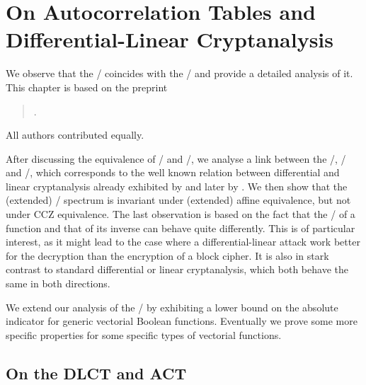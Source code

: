 \chapter[On Autcorrelation Tables]{On Autocorrelation Tables and Differential-Linear Cryptanalysis}\label{ch:act}

\vspace*{-\baselineskip}
\hspace{1.5em}
We observe that the \DLCT/ coincides with the \ACT/ and provide a detailed analysis of it.
This chapter is based on the preprint
\begin{quote}
    .
\end{quote}
All authors contributed equally.

After discussing the equivalence of \DLCT/ and \ACT/, we analyse a link between the \ACT/, \DDT/ and \LAT/, which corresponds to the well known relation between differential and linear cryptanalysis already exhibited by \textcite{EC:ChaVau94} and later by \textcite{EC:BloNyb13}.
We then show that the (extended) \ACT/ spectrum is invariant under (extended) affine equivalence, but not under CCZ equivalence.
The last observation is based on the fact that the \ACT/ of a function and that of its inverse can behave quite differently.
This is of particular interest, as it might lead to the case where a differential-linear attack work better for the decryption than the encryption of a block cipher.
It is also in stark contrast to standard differential or linear cryptanalysis, which both behave the same in both directions.

We extend our analysis of the \ACT/ by exhibiting a lower bound on the absolute indicator for generic vectorial Boolean functions.
Eventually we prove some more specific properties for some specific types of vectorial functions.

\section{On the DLCT and ACT}%
\label{sec:act:dlct}

